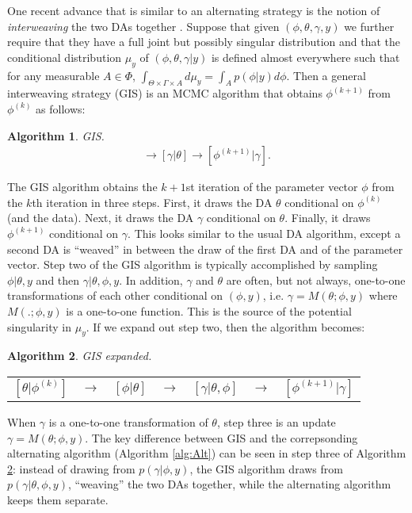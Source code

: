 \documentclass{article}
\newtheorem{alg}{Algorithm}
\begin{document}
One recent advance that is similar to an alternating strategy is the notion of {\it interweaving} the two DAs together \cite{yu2011center}. Suppose that given $(\phi,\theta,\gamma,y)$ we further require that they have a full joint but possibly singular distribution and that the conditional distribution $\mu_y$ of $(\phi,\theta,\gamma|y)$ is defined almost everywhere such that for any measurable $A\in \Phi$, $\int_{\Theta \times \Gamma \times A}d\mu_y = \int_Ap(\phi|y)d\phi$. Then a general interweaving strategy (GIS) is an MCMC algorithm that obtains $\phi^{(k+1)}$ from $\phi^{(k)}$ as follows:
\begin{alg}GIS.\label{alg:GIS}
  \begin{align*}
    [\theta|\phi^{(k)}] \to [\gamma|\theta] \to [\phi^{(k+1)}|\gamma].
  \end{align*}
\end{alg}
\noindent The GIS algorithm obtains the $k+1$st iteration of the parameter vector $\phi$ from the $k$th iteration in three steps. First, it draws the DA $\theta$ conditional on $\phi^{(k)}$ (and the data). Next, it draws the DA $\gamma$ conditional on $\theta$. Finally, it draws $\phi^{(k+1)}$ conditional on $\gamma$. This looks similar to the usual DA algorithm, except a second DA is ``weaved'' in between the draw of the first DA and of the parameter vector. Step two of the GIS algorithm is typically accomplished by sampling $\phi|\theta,y$ and then $\gamma|\theta,\phi,y$. In addition, $\gamma$ and $\theta$ are often, but not always, one-to-one transformations of each other conditional on $(\phi,y)$, i.e. $\gamma = M(\theta;\phi,y)$ where $M(.;\phi,y)$ is a one-to-one function. This is the source of the potential singularity in $\mu_y$. If we expand out step two, then the algorithm becomes:
\begin{alg}GIS expanded.\label{alg:GIS2}\\
  \begin{center}
    \begin{tabular}{lllllll}
      $[\theta|\phi^{(k)}]$& $\to$& $[\phi|\theta]$& $\to $&$[\gamma|\theta,\phi]$& $\to$& $[\phi^{(k+1)}|\gamma]$
    \end{tabular}
  \end{center}
\noindent \end{alg}
When $\gamma$ is a one-to-one transformation of $\theta$, step three is an update $\gamma=M(\theta;\phi,y)$. The key difference between GIS and the correpsonding alternating algorithm (Algorithm \ref{alg:Alt}) can be seen in step three of Algorithm \ref{alg:GIS2}: instead of drawing from $p(\gamma|\phi,y)$, the GIS algorithm draws from $p(\gamma|\theta,\phi,y)$, ``weaving'' the two DAs together, while the alternating algorithm keeps them separate.
\end{document}
